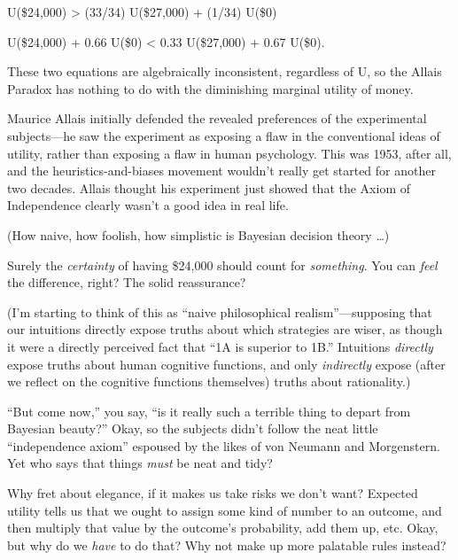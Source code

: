 {\centering
 U(\$24,000) {\textgreater} (33/34) {\texttimes} U(\$27,000) +
(1/34) {\texttimes} U(\$0)
\par}


\bigskip

{ {\texttimes} U(\$24,000) + 0.66 {\texttimes} U(\$0)
{\textless} 0.33 {\texttimes} U(\$27,000) + 0.67 {\texttimes} U(\$0).
\par}


\bigskip

{
 These two equations are algebraically inconsistent, regardless of
U, so the Allais Paradox has nothing to do with the diminishing
marginal utility of money. }

{
 Maurice Allais initially defended the revealed preferences of the
experimental subjects---he saw the experiment as exposing a flaw in the
conventional ideas of utility, rather than exposing a flaw in human
psychology. This was 1953, after all, and the heuristics-and-biases
movement wouldn't really get started for another two
decades. Allais thought his experiment just showed that the Axiom of
Independence clearly wasn't a good idea in real life.}

{
 (How naive, how foolish, how simplistic is Bayesian decision
theory \ldots)}

{
 Surely the \textit{certainty} of having \$24,000 should count for
\textit{something}. You can \textit{feel} the difference, right? The
solid reassurance?}

{
 (I'm starting to think of this as
``naive philosophical
realism''---supposing that our intuitions directly
expose truths about which strategies are wiser, as though it were a
directly perceived fact that ``1A is superior to
1B.'' Intuitions \textit{directly} expose truths
about human cognitive functions, and only \textit{indirectly} expose
(after we reflect on the cognitive functions themselves) truths about
rationality.)}

{
 ``But come now,'' you say,
``is it really such a terrible thing to depart from
Bayesian beauty?'' Okay, so the subjects
didn't follow the neat little
``independence axiom'' espoused by
the likes of von Neumann and Morgenstern. Yet who says that things
\textit{must} be neat and tidy?}

{
 Why fret about elegance, if it makes us take risks we
don't want? Expected utility tells us that we ought to
assign some kind of number to an outcome, and then multiply that value
by the outcome's probability, add them up, etc. Okay,
but why do we \textit{have} to do that? Why not make up more palatable
rules instead?}


